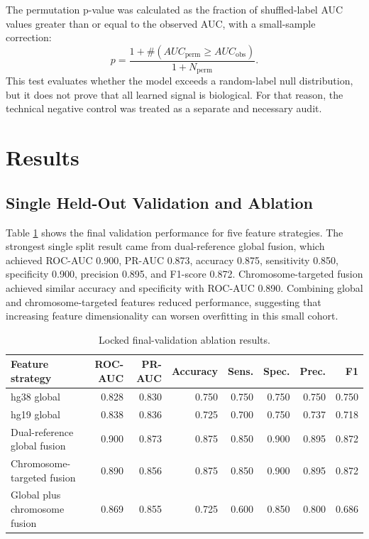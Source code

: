 \documentclass[conference]{IEEEtran}
\begin{document}
The permutation p-value was calculated as the fraction of shuffled-label AUC values greater than or equal to the observed AUC, with a small-sample correction:
\begin{equation}
    p = \frac{1 + \#(AUC_{\mathrm{perm}} \geq AUC_{\mathrm{obs}})}{1 + N_{\mathrm{perm}}}.
\end{equation}
This test evaluates whether the model exceeds a random-label null distribution, but it does not prove that all learned signal is biological. For that reason, the technical negative control was treated as a separate and necessary audit.

\section{Results}
\subsection{Single Held-Out Validation and Ablation}
Table \ref{tab:ablation} shows the final validation performance for five feature strategies. The strongest single split result came from dual-reference global fusion, which achieved ROC-AUC 0.900, PR-AUC 0.873, accuracy 0.875, sensitivity 0.850, specificity 0.900, precision 0.895, and F1-score 0.872. Chromosome-targeted fusion achieved similar accuracy and specificity with ROC-AUC 0.890. Combining global and chromosome-targeted features reduced performance, suggesting that increasing feature dimensionality can worsen overfitting in this small cohort.

\begin{table}[t]
\centering
\caption{Locked final-validation ablation results.}
\label{tab:ablation}
\begin{tabular}{lrrrrrrr}
\toprule
Feature strategy & ROC-AUC & PR-AUC & Accuracy & Sens. & Spec. & Prec. & F1 \\
\midrule
hg38 global & 0.828 & 0.830 & 0.750 & 0.750 & 0.750 & 0.750 & 0.750 \\
hg19 global & 0.838 & 0.836 & 0.725 & 0.700 & 0.750 & 0.737 & 0.718 \\
Dual-reference global fusion & 0.900 & 0.873 & 0.875 & 0.850 & 0.900 & 0.895 & 0.872 \\
Chromosome-targeted fusion & 0.890 & 0.856 & 0.875 & 0.850 & 0.900 & 0.895 & 0.872 \\
Global plus chromosome fusion & 0.869 & 0.855 & 0.725 & 0.600 & 0.850 & 0.800 & 0.686 \\
\bottomrule
\end{tabular}
\end{table}
\end{document}

